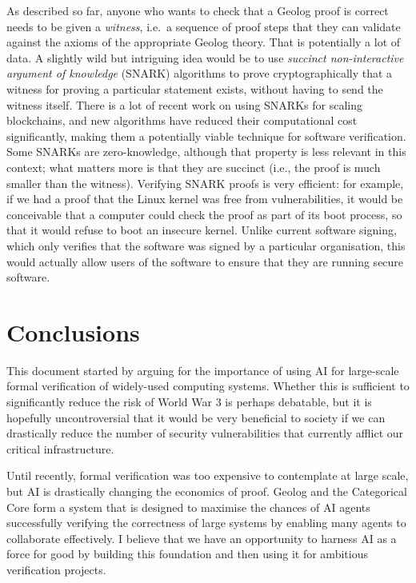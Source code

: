 \documentclass{article}
\begin{document}
As described so far, anyone who wants to check that a Geolog proof is correct needs to be given a \emph{witness}, i.e.\ a sequence of proof steps that they can validate against the axioms of the appropriate Geolog theory.
That is potentially a lot of data.
A slightly wild but intriguing idea would be to use \emph{succinct non-interactive argument of knowledge} (SNARK) algorithms to prove cryptographically that a witness for proving a particular statement exists, without having to send the witness itself.
There is a lot of recent work on using SNARKs for scaling blockchains, and new algorithms have reduced their computational cost significantly, making them a potentially viable technique for software verification.
Some SNARKs are zero-knowledge, although that property is less relevant in this context; what matters more is that they are succinct (i.e., the proof is much smaller than the witness).
Verifying SNARK proofs is very efficient: for example, if we had a proof that the Linux kernel was free from vulnerabilities, it would be conceivable that a computer could check the proof as part of its boot process, so that it would refuse to boot an insecure kernel.
Unlike current software signing, which only verifies that the software was signed by a particular organisation, this would actually allow users of the software to ensure that they are running secure software.

\section{Conclusions}

This document started by arguing for the importance of using AI for large-scale formal verification of widely-used computing systems.
Whether this is sufficient to significantly reduce the risk of World War 3 is perhaps debatable, but it is hopefully uncontroversial that it would be very beneficial to society if we can drastically reduce the number of security vulnerabilities that currently afflict our critical infrastructure.

Until recently, formal verification was too expensive to contemplate at large scale, but AI is drastically changing the economics of proof.
Geolog and the Categorical Core form a system that is designed to maximise the chances of AI agents successfully verifying the correctness of large systems by enabling many agents to collaborate effectively.
I believe that we have an opportunity to harness AI as a force for good by building this foundation and then using it for ambitious verification projects.



\end{document}

